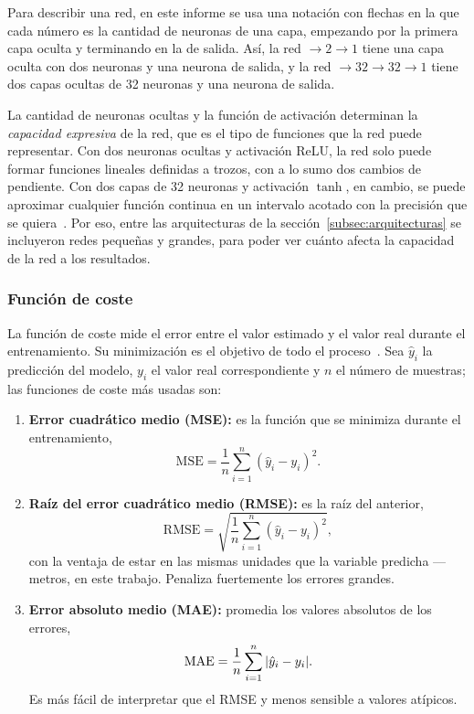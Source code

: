 \documentclass[titlepage,11pt]{article}
\begin{document}
Para describir una red, en este informe se usa una notación con flechas en la
que cada número es la cantidad de neuronas de una capa, empezando por la
primera capa oculta y terminando en la de salida. Así, la red $\to2\to1$ tiene
una capa oculta con dos neuronas y una neurona de salida, y la red
$\to32\to32\to1$ tiene dos capas ocultas de 32 neuronas y una neurona de
salida.

La cantidad de neuronas ocultas y la función de activación determinan la
\emph{capacidad expresiva} de la red, que es el tipo de funciones que la red
puede representar. Con dos neuronas ocultas y activación ReLU, la red solo
puede formar funciones lineales definidas a trozos, con a lo sumo dos cambios
de pendiente. Con dos capas de 32 neuronas y activación $\tanh$, en cambio, se
puede aproximar cualquier función continua en un intervalo acotado con la
precisión que se quiera~\cite{goodfellow_2016_deep}. Por eso, entre las
arquitecturas de la sección~\ref{subsec:arquitecturas} se incluyeron redes
pequeñas y grandes, para poder ver cuánto afecta la capacidad de la red a los
resultados.

\subsubsection{Función de coste}
\label{subsubsec:coste}
La función de coste mide el error entre el valor estimado y el valor real
durante el entrenamiento. Su minimización es el objetivo de todo el
proceso~\cite{antonio_2023_introduccin,ibm_qu}. Sea $\hat y_i$ la
predicción del modelo, $y_i$ el valor real correspondiente y $n$ el número de
muestras; las funciones de coste más usadas son:

\begin{enumerate}
\item \textbf{Error cuadrático medio (MSE):} es la función que se minimiza
  durante el entrenamiento,
  \begin{equation}
    \mathrm{MSE}=\frac{1}{n}\sum_{i=1}^{n}(\hat y_i-y_i)^2.
  \end{equation}

\item \textbf{Raíz del error cuadrático medio (RMSE):} es la raíz del anterior,
  \begin{equation}
    \mathrm{RMSE}=\sqrt{\frac{1}{n}\sum_{i=1}^{n}(\hat y_i-y_i)^2},
  \end{equation}
  con la ventaja de estar en las mismas unidades que la variable predicha ---
  metros, en este trabajo. Penaliza fuertemente los errores grandes.

\item \textbf{Error absoluto medio (MAE):} promedia los valores absolutos de
  los errores,
  \begin{equation}
    \mathrm{MAE}=\frac{1}{n}\sum_{i=1}^{n}\abs{\hat y_i-y_i}.
  \end{equation}
  Es más fácil de interpretar que el RMSE y menos sensible a valores atípicos.
\end{enumerate}
\end{document}

